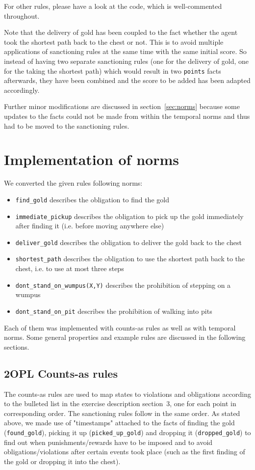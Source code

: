 \documentclass[a4paper,11pt]{article}
\begin{document}
For other rules, please have a look at the code, which is well-commented throughout.

Note that the delivery of gold has been coupled to the fact whether the agent took the shortest path back to the chest or not. This is to avoid multiple applications of sanctioning rules at the same time with the same initial score. So instead of having two separate sanctioning rules (one for the delivery of gold, one for the taking the shortest path) which would result in two \texttt{points} facts afterwards, they have been combined and the score to be added has been adapted accordingly.

Further minor modifications are discussed in section~\ref{sec:norms} because some updates to the facts could not be made from within the temporal norms and thus had to be moved to the sanctioning rules.

\section{Implementation of norms}
We converted the given rules following norms:
\begin{itemize}
  \item \texttt{find\_gold} describes the obligation to find the gold
  \item \texttt{immediate\_pickup} describes the obligation to pick up the gold immediately after finding it (i.e. before moving anywhere else)
  \item \texttt{deliver\_gold} describes the obligation to deliver the gold back to the chest
  \item \texttt{shortest\_path} describes the obligation to use the shortest path back to the chest, i.e. to use at most three steps
  \item \texttt{dont\_stand\_on\_wumpus(X,Y)} describes the prohibition of stepping on a wumpus
  \item \texttt{dont\_stand\_on\_pit} describes the prohibition of walking into pits
\end{itemize}

Each of them was implemented with counts-as rules as well as with temporal norms. Some general properties and example rules are discussed in the following sections.

\subsection{2OPL Counts-as rules}
\label{sec:counts}
The counts-as rules are used to map states to violations and obligations according to the bulleted list in the exercise description section~3, one for each point in corresponding order. The sanctioning rules follow in the same order. As stated above, we made use of "timestamps" attached to the facts of finding the gold (\texttt{found\_gold}), picking it up (\texttt{picked\_up\_gold}) and dropping it (\texttt{dropped\_gold}) to find out when punishments/rewards have to be imposed and to avoid obligations/violations after certain events took place (such as the first finding of the gold or dropping it into the chest).
\end{document}
